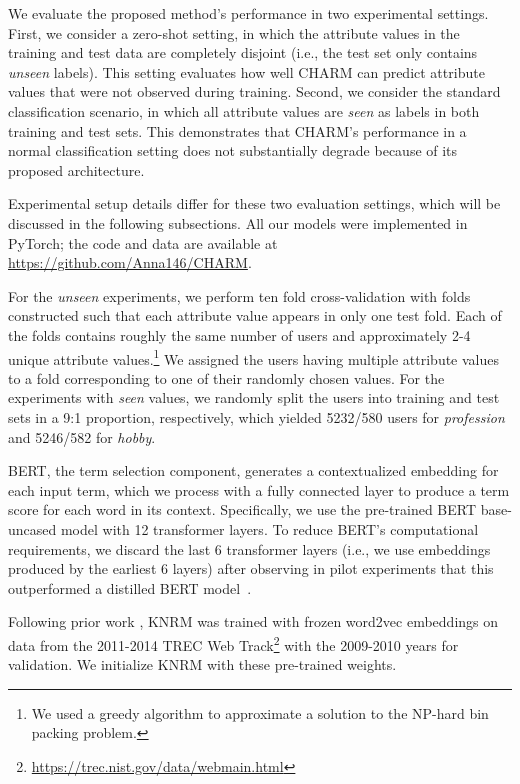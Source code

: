 
We evaluate the proposed method's performance in two experimental settings.
First, we consider a zero-shot setting, in which the attribute values in the training and test data are completely disjoint (i.e., the test set only contains \emph{unseen} labels).
This setting evaluates how well CHARM can predict attribute values that were not observed during training.
Second, we consider the standard classification scenario, in which all attribute values are \emph{seen} as labels in both training and test sets.
This demonstrates that CHARM's performance in a normal classification setting does not substantially degrade because of its proposed architecture.

Experimental setup details
differ for these two evaluation settings, which will be discussed in the following subsections.
All our models were implemented in PyTorch; the code and data are available at \url{https://github.com/Anna146/CHARM}.


For the \emph{unseen} experiments, we perform ten fold cross-validation with folds constructed such that each attribute value appears in only one test fold.
Each of the folds contains roughly the same number of users and approximately 2-4 unique attribute values.\footnote{We used a greedy algorithm to approximate a solution to the NP-hard bin packing problem.} We assigned the users having multiple attribute values to a fold corresponding to one of their randomly chosen values.
For the experiments with \emph{seen} values, we randomly split the users into training and test sets in a 9:1 proportion, respectively, which yielded 5232/580 users for \emph{profession} and 5246/582 for \emph{hobby}.


BERT, the term selection component, generates a contextualized embedding 
for each input term, which we process with a fully connected layer to produce a term score for each word in its context. Specifically, we use the pre-trained BERT base-uncased model with 12 transformer layers. 
To reduce BERT's computational requirements, we discard the last 6 transformer layers (i.e., we use embeddings produced by the earliest 6 layers) after observing in pilot experiments that this outperformed a distilled BERT model~\cite{sanh2019distilbert}.

Following prior work \cite{copacrr}, KNRM was trained
with frozen word2vec embeddings on data from the 2011-2014 \textsc{TREC} Web Track\footnote{\url{https://trec.nist.gov/data/webmain.html}} with the 2009-2010 years for validation. We initialize KNRM with these pre-trained weights.

